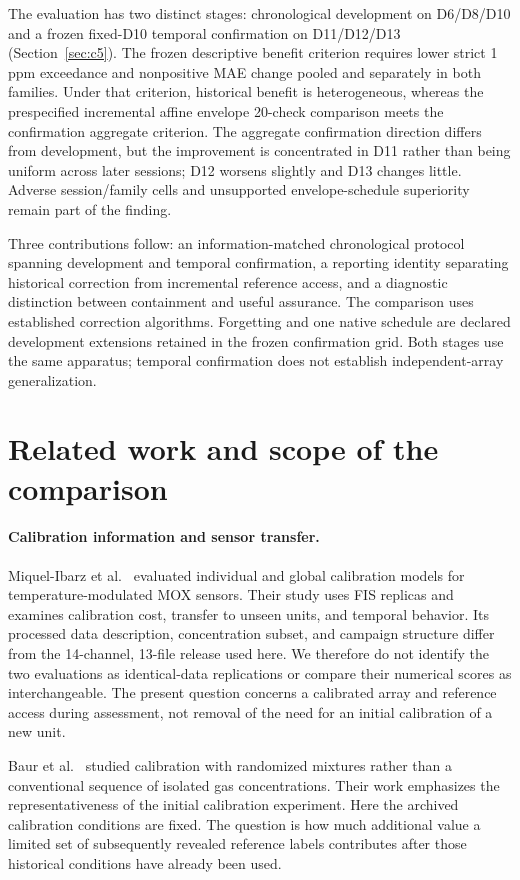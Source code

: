 The evaluation has two distinct stages: chronological development on D6/D8/D10 and a frozen fixed-D10 temporal confirmation on D11/D12/D13 (Section~\ref{sec:c5}). The frozen descriptive benefit criterion requires lower strict 1 ppm exceedance and nonpositive MAE change pooled and separately in both families. Under that criterion, historical benefit is heterogeneous, whereas the prespecified incremental affine envelope 20-check comparison meets the confirmation aggregate criterion. The aggregate confirmation direction differs from development, but the improvement is concentrated in D11 rather than being uniform across later sessions; D12 worsens slightly and D13 changes little. Adverse session/family cells and unsupported envelope-schedule superiority remain part of the finding.

Three contributions follow: an information-matched chronological protocol spanning development and temporal confirmation, a reporting identity separating historical correction from incremental reference access, and a diagnostic distinction between containment and useful assurance. The comparison uses established correction algorithms. Forgetting and one native schedule are declared development extensions retained in the frozen confirmation grid. Both stages use the same apparatus; temporal confirmation does not establish independent-array generalization.

\section{Related work and scope of the comparison}\label{sec:related}
\paragraph{Calibration information and sensor transfer.}
Miquel-Ibarz et al.~\cite{miquel2022} evaluated individual and global calibration models for temperature-modulated MOX sensors. Their study uses FIS replicas and examines calibration cost, transfer to unseen units, and temporal behavior. Its processed data description, concentration subset, and campaign structure differ from the 14-channel, 13-file release used here. We therefore do not identify the two evaluations as identical-data replications or compare their numerical scores as interchangeable. The present question concerns a calibrated array and reference access during assessment, not removal of the need for an initial calibration of a new unit.

Baur et al.~\cite{baur2020} studied calibration with randomized mixtures rather than a conventional sequence of isolated gas concentrations. Their work emphasizes the representativeness of the initial calibration experiment. Here the archived calibration conditions are fixed. The question is how much additional value a limited set of subsequently revealed reference labels contributes after those historical conditions have already been used.


